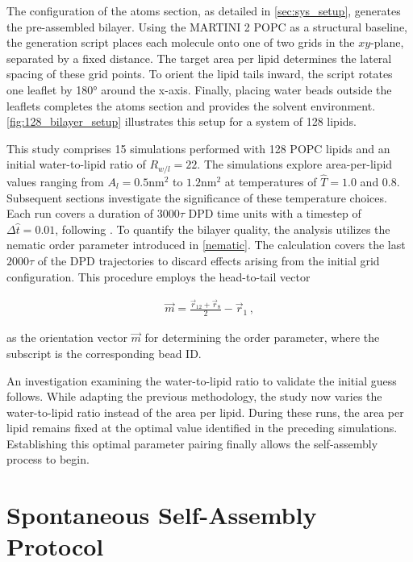 \documentclass[
    11pt,
    a4paper,
    oneside,        %
    BCOR=10mm,      %
    parskip=half,   %
    listof=nototoc,   %
    bibliography=totoc %
]{scrreprt}
\begin{document}
The configuration of the atoms section, as detailed in \cref{sec:sys_setup}, generates the pre-assembled bilayer. Using the MARTINI 2 POPC as a structural baseline, the generation script places each molecule onto one of two grids in the $xy$-plane, separated by a fixed distance. The target area per lipid determines the lateral spacing of these grid points. To orient the lipid tails inward, the script rotates one leaflet by 180° around the x-axis. Finally, placing water beads outside the leaflets completes the atoms section and provides the solvent environment. \cref{fig:128_bilayer_setup} illustrates this setup for a system of 128 lipids.

This study comprises 15 simulations performed with 128 POPC lipids and an initial water-to-lipid ratio of $R_{w/l}=22$. The simulations explore area-per-lipid values ranging from $A_l = 0.5\si{\nano\m\squared}$ to $1.2\si{\nano\m\squared}$ at temperatures of $\hat{T}=1.0$ and $0.8$. Subsequent sections investigate the significance of these temperature choices. Each run covers a duration of $3000\tau$ DPD time units with a timestep of $\Delta \hat{t} = 0.01$, following \citeauthor{Wang2024} \cite{Wang2024}. To quantify the bilayer quality, the analysis utilizes the nematic order parameter introduced in \cref{nematic}. The calculation covers the last $2000 \tau$ of the DPD trajectories to discard effects arising from the initial grid configuration. This procedure employs the head-to-tail vector

\begin{align}
    \vec{m} = \frac{\vec{r}_{12} + \vec{r}_8}{2} - \vec{r}_1\, ,
\end{align}

as the orientation vector $\vec{m}$ for determining the order parameter, where the subscript is the corresponding bead ID. 

An investigation examining the water-to-lipid ratio to validate the initial guess follows. While adapting the previous methodology, the study now varies the water-to-lipid ratio instead of the area per lipid. During these runs, the area per lipid remains fixed at the optimal value identified in the preceding simulations. Establishing this optimal parameter pairing finally allows the self-assembly process to begin.

\section{Spontaneous Self-Assembly Protocol} \label{sec:128_assembly}
\end{document}
